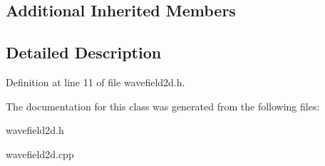 \subsection*{Additional Inherited Members}


\subsection{Detailed Description}


Definition at line 11 of file wavefield2d.\-h.



The documentation for this class was generated from the following files\-:\begin{DoxyCompactItemize}
\item 
wavefield2d.\-h\item 
wavefield2d.\-cpp\end{DoxyCompactItemize}
